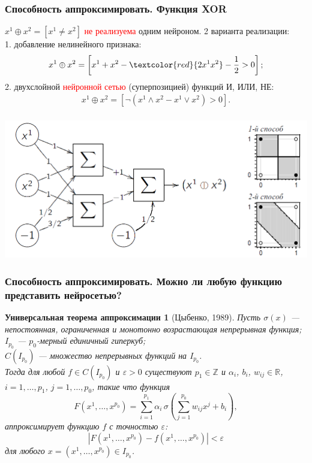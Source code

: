 \documentclass[10pt]{beamer}
\newtheorem{theorems}{Универсальная теорема аппроксимации}
\begin{document}
 
\begin{frame}
\frametitle{Способность аппроксимировать. Функция XOR}
\vspace{0.1cm}
$x^1 \oplus x^2 = [ x^1 \neq x^2]$ \textcolor{red}{не реализуема} одним нейроном. 2 варианта реализации:\\
\vspace{0.3cm}
1. добавление нелинейного признака:
\begin{gather*}
x^1 \oplus x^2 = \left[x^1 + x^2 - \textcolor{red}{2 x^1 x^2} - \frac{1}{2} > 0\right]; \\
\end{gather*}
2. двухслойной \textcolor{red}{нейронной сетью} (суперпозицией) функций И, ИЛИ, НЕ:
\begin{gather*}
x^1 \oplus x^2 = \left[ \neg \left( x^1 \wedge x^2 - x^1 \vee x^2 \right)  > 0\right]. \\
\end{gather*}

\begin{center}
	\includegraphics[scale=0.27]{xor}
\end{center}
\end{frame} 

\begin{frame}
\frametitle{Способность аппроксимировать. Можно ли любую функцию представить нейросетью?}

\begin{theorems}[Цыбенко, 1989]
Пусть $\sigma(x)$ --- непостоянная, ограниченная и монотонно возрастающая непрерывная функция;\\
$I_{p_0}$ --- ${p_0}$-мерный единичный гиперкуб;\\
$C(I_{p_0})$ --- множество непрерывных функций на $I_{p_0}$.\\
Тогда для любой $f \in C(I_{p_0})$ и $\varepsilon > 0$ существуют $p_1 \in \mathbb{Z}$ и  $\alpha_i$, $b_i$, $w_{ij} \in \mathbb{R}$, $i=1,\ldots,p_1$, $j=1,\ldots, p_0$, такие что функция
\begin{equation*}
F(x^1, \ldots, x^{p_0})=\sum_{i=1}^{p_1} \alpha_i \, \sigma \left(\sum_{j=1}^{p_0} w_{ij} x^j + b_i   \right),
\end{equation*}
аппроксимирует функцию $f$ с точностью $\varepsilon$:
 \begin{equation*}
| F(x^1, \ldots, x^{p_0}) - f(x^1, \ldots, x^{p_0})| < \varepsilon
\end{equation*} 
для любого $x=(x^1, \ldots, x^{p_0}) \in I_{p_0}$.
\end{theorems}

\end{frame} 
\end{document}
